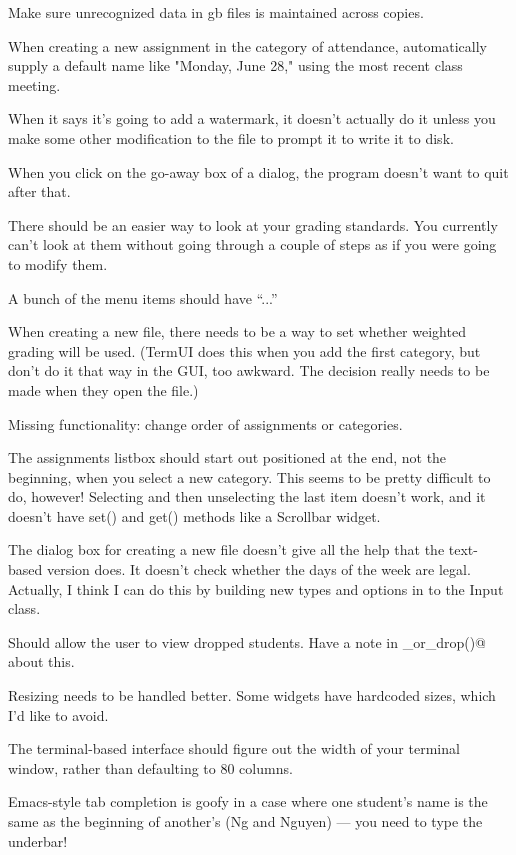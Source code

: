 \documentclass{opengrade_doc}
\begin{document}
Make sure unrecognized data in gb files is maintained across copies.

When creating a new assignment in the category of attendance, automatically supply a default
     name like "Monday, June 28," using the most recent class meeting.

When it says it's going to add a watermark, it doesn't actually do it unless you make some
other modification to the file to prompt it to write it to disk.

When you click on the go-away box of a dialog, the program doesn't want to quit after that.

There should be an easier way to look at your grading standards. You currently
can't look at them without going through a couple of steps as if you were
going to modify them.

A bunch of the menu items should have ``...''

When creating a new file, there needs to be a way to set whether weighted grading
will be used. (TermUI does this when you add the first category, but don't do it
that way in the GUI, too awkward. The decision really needs to be made when they
open the file.) 

Missing functionality: 
change order of assignments or categories.

The assignments listbox should start out positioned
at the end, not the beginning, when you select a new category. This seems to be
pretty difficult to do, however! Selecting and then unselecting the last item
doesn't work, and it doesn't have set() and get() methods like a Scrollbar widget.

The dialog box for creating a new file doesn't give all the
help that the text-based version does. It doesn't check 
 whether the days of the week are legal. Actually, I think
I can do this by building new types and options in to the Input class.

Should allow the user to view dropped students. Have a note in 
\verb@add_or_drop()@
about this.

Resizing needs to be handled better. Some widgets have hardcoded sizes, which
I'd like to avoid.


The terminal-based interface should figure out the width of your terminal
window, rather than defaulting to 80 columns.

Emacs-style tab completion is goofy in a case where one student's name
is the same as the beginning of another's (Ng and Nguyen) --- you need
to type the underbar!
\end{document}
